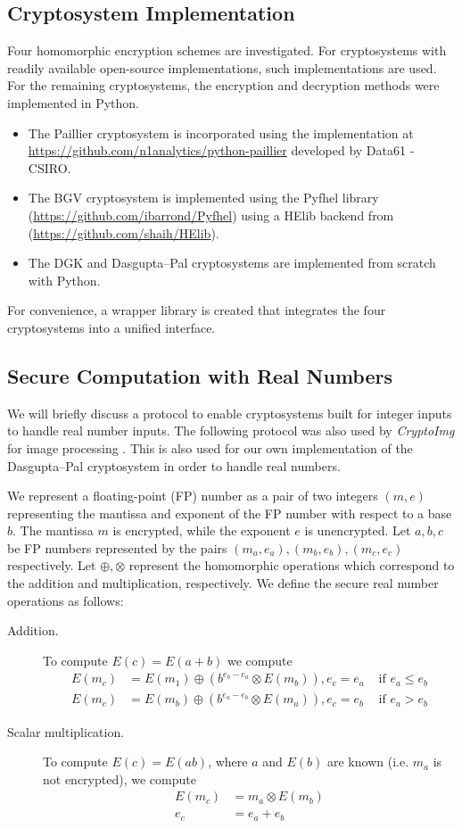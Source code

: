 \subsection{Cryptosystem Implementation}
Four homomorphic encryption schemes are investigated. For cryptosystems with readily available open-source implementations, such implementations are used. For the remaining cryptosystems, the encryption and decryption methods were implemented in Python.
\begin{itemize}
	\item The Paillier cryptosystem is incorporated using the implementation at \url{https://github.com/n1analytics/python-paillier} developed by Data61 - CSIRO.
	\item The BGV cryptosystem is implemented using the Pyfhel library (\url{https://github.com/ibarrond/Pyfhel}) using a HElib backend from (\url{https://github.com/shaih/HElib}).
	\item The DGK and Dasgupta--Pal cryptosystems are implemented from scratch with Python.
\end{itemize}

For convenience, a wrapper library is created that integrates the four cryptosystems into a unified interface.

\subsection{Secure Computation with Real Numbers}
We will briefly discuss a protocol to enable cryptosystems built for integer inputs to handle real number inputs.
The following protocol was also used by \textit{CryptoImg} for image processing \cite{ziad_cryptoimg:_2016}.
This is also used for our own implementation of the Dasgupta--Pal cryptosystem in order to handle real numbers.

We represent a floating-point (FP) number as a pair of two integers $(m,e)$ representing the mantissa and exponent of the FP number with respect to a base $b$. The mantissa $m$ is encrypted, while the exponent $e$ is unencrypted.
Let $a,b,c$ be FP numbers represented by the pairs $(m_a,e_a),(m_b,e_b),(m_c,e_c)$ respectively. Let $\oplus,\otimes$ represent the homomorphic operations which correspond to the addition and multiplication, respectively. We define the secure real number operations as follows:
\begin{description}
  \item[Addition.]
    To compute $E(c)=E(a+b)$ we compute
    \begin{align*}
      E(m_c) &= E(m_1) \oplus (b^{e_b-e_a} \otimes E(m_b)), e_c = e_a & \text{ if } e_a \leq e_b \\
      E(m_c) &= E(m_b) \oplus (b^{e_a-e_b} \otimes E(m_a)), e_c = e_b & \text{ if } e_a > e_b
    \end{align*}
  \item[Scalar multiplication.]
    To compute $E(c) = E(ab)$, where $a$ and $E(b)$ are known (i.e. $m_a$ is not encrypted), we compute
    \begin{align*}
      E(m_c) &= m_a \otimes E(m_b)\\
      e_c &= e_a + e_b
    \end{align*}
\end{description}

